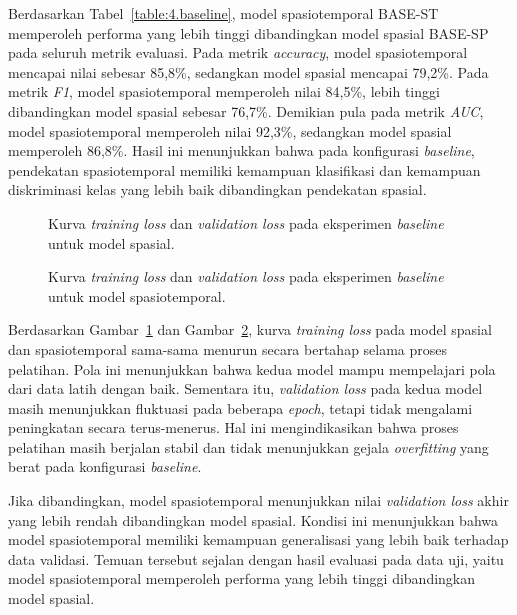 Berdasarkan Tabel~\ref{table:4.baseline}, model spasiotemporal BASE-ST memperoleh performa yang lebih tinggi dibandingkan model spasial BASE-SP pada seluruh metrik evaluasi. Pada metrik \textit{accuracy}, model spasiotemporal mencapai nilai sebesar 85,8\%, sedangkan model spasial mencapai 79,2\%. Pada metrik \textit{F1}, model spasiotemporal memperoleh nilai 84,5\%, lebih tinggi dibandingkan model spasial sebesar 76,7\%. Demikian pula pada metrik \textit{AUC}, model spasiotemporal memperoleh nilai 92,3\%, sedangkan model spasial memperoleh 86,8\%. Hasil ini menunjukkan bahwa pada konfigurasi \textit{baseline}, pendekatan spasiotemporal memiliki kemampuan klasifikasi dan kemampuan diskriminasi kelas yang lebih baik dibandingkan pendekatan spasial.

\begin{figure}[htbp]
	\centering
	\caption{Kurva \textit{training loss} dan \textit{validation loss} pada eksperimen \textit{baseline} untuk model spasial.}
	\label{fig:4.baseline-loss-spatial}
\end{figure}

\begin{figure}[htbp]
	\centering
	\caption{Kurva \textit{training loss} dan \textit{validation loss} pada eksperimen \textit{baseline} untuk model spasiotemporal.}
	\label{fig:4.baseline-loss-spatiotemporal}
\end{figure}

Berdasarkan Gambar~\ref{fig:4.baseline-loss-spatial} dan Gambar~\ref{fig:4.baseline-loss-spatiotemporal}, kurva \textit{training loss} pada model spasial dan spasiotemporal sama-sama menurun secara bertahap selama proses pelatihan. Pola ini menunjukkan bahwa kedua model mampu mempelajari pola dari data latih dengan baik. Sementara itu, \textit{validation loss} pada kedua model masih menunjukkan fluktuasi pada beberapa \textit{epoch}, tetapi tidak mengalami peningkatan secara terus-menerus. Hal ini mengindikasikan bahwa proses pelatihan masih berjalan stabil dan tidak menunjukkan gejala \textit{overfitting} yang berat pada konfigurasi \textit{baseline}.

Jika dibandingkan, model spasiotemporal menunjukkan nilai \textit{validation loss} akhir yang lebih rendah dibandingkan model spasial. Kondisi ini menunjukkan bahwa model spasiotemporal memiliki kemampuan generalisasi yang lebih baik terhadap data validasi. Temuan tersebut sejalan dengan hasil evaluasi pada data uji, yaitu model spasiotemporal memperoleh performa yang lebih tinggi dibandingkan model spasial.

